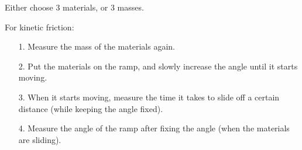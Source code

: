 \documentclass{article}
\begin{document}
Either choose $3$ materials, or $3$ masses.

\hfil

For kinetic friction:
\begin{itemize}
    \item[1.] Measure the mass of the materials again.
    \item[2.] Put the materials on the ramp, and slowly increase the angle until it starts moving.
    \item[3.] When it starts moving, measure the time it takes to slide off a certain distance (while keeping the angle fixed).
    \item[4.] Measure the angle of the ramp after fixing the angle (when the materials are sliding). 
\end{itemize}


\newpage
\end{document}
